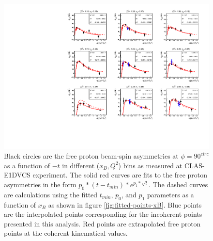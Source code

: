 \begin{figure}[tpb]
\centering
\includegraphics[scale=0.85]{fig_updated/ALU-proton-fits.pdf}
\caption{Black circles are the free proton beam-spin asymmetries at $\phi = 90 
^{circ}$ as a function of $-t$ in different ($x_B, Q^2$) bins as measured at 
CLAS-E1DVCS experiment. The solid red curves are fits to the free proton 
asymmetries in the form $p_{0}*(t-t_{min})*e^{p_{1}*\sqrt{t}}$. The dashed 
curves are calculations using the fitted $t_{min}$, $p_0$, and $p_1$ parameters 
as a function of $x_B$ as shown in figure \ref{fig:fitted-points-xB}. Blue 
points are the interpolated points corresponding for the incoherent points 
presented in this analysis. Red points are extrapolated free proton points at 
the coherent kinematical values.}
\label{fig:free-proton-alu}
\end{figure}


